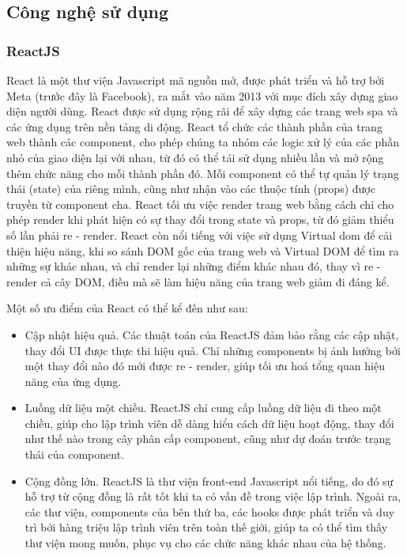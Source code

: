 \subsection{Công nghệ sử dụng}
\subsubsection{ReactJS}
React là một thư viện Javascript mã nguồn mở, được phát triển và hỗ trợ bởi
Meta (trước đây là Facebook), ra mắt vào năm 2013 với mục đích xây dựng giao
diện người dùng. React được sử dụng rộng rãi để xây dựng các trang web \acrfull*{spa} và các ứng dụng trên nền tảng di động. React tổ chức
các thành phần của trang web thành các component, cho phép chúng ta nhóm các
logic xử lý của các phần nhỏ của giao diện lại với nhau, từ đó có thể tái sử
dụng nhiều lần và mở rộng thêm chức năng cho mỗi thành phần đó. Mỗi component
có thể tự quản lý trạng thái (state) của riêng mình, cũng như nhận vào các
thuộc tính (props) được truyền từ component cha. React tối ưu việc render trang
web bằng cách chỉ cho phép render khi phát hiện có sự thay đổi trong state và
props, từ đó giảm thiểu số lần phải re - render. React còn nổi tiếng với việc
sử dụng Virtual \acrshort*{dom} để cải thiện hiệu năng, khi so sánh DOM gốc của trang web
và Virtual DOM để tìm ra những sự khác nhau, và chỉ render lại những điểm khác
nhau đó, thay vì re - render cả cây DOM, điều mà sẽ làm hiệu năng của trang web
giảm đi đáng kể.
\par
Một số ưu điểm của React có thể kể đến như sau:
\begin{itemize}
    \item Cập nhật hiệu quả. Các thuật toán của ReactJS đảm bảo rằng các cập nhật, thay
          đổi UI được thực thi hiệu quả. Chỉ những components bị ảnh hưởng bởi một thay
          đổi nào đó mới được re - render, giúp tối ưu hoá tổng quan hiệu năng của ứng
          dụng.
    \item Luồng dữ liệu một chiều. ReactJS chỉ cung cấp luồng dữ liệu đi theo một chiều,
          giúp cho lập trình viên dễ dàng hiểu cách dữ liệu hoạt động, thay đổi như thế
          nào trong cây phân cấp component, cũng như dự đoán trước trạng thái của
          component.
    \item Cộng đồng lớn. ReactJS là thư viện front-end Javascript nổi tiếng, do đó sự hỗ
          trợ từ cộng đồng là rất tốt khi ta có vấn đề trong việc lập trình. Ngoài ra,
          các thư viện, components của bên thứ ba, các hooks được phát triển và duy trì
          bởi hàng triệu lập trình viên trên toàn thế giới, giúp ta có thể tìm thấy thư
          viện mong muốn, phục vụ cho các chức năng khác nhau của hệ thống.
\end{itemize}
